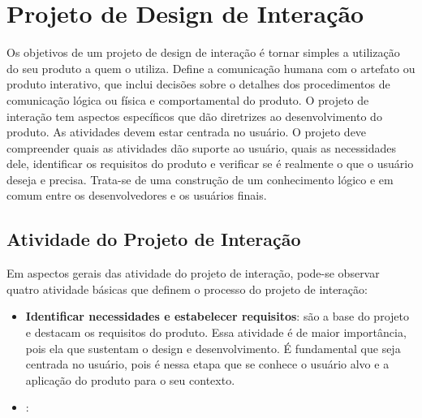 \chapter[Projeto de Design de Interação]{Projeto de Design de Interação}

Os objetivos de um projeto de design de interação é tornar simples a utilização do seu produto a quem o utiliza. Define a comunicação humana com o artefato ou produto interativo, que inclui decisões sobre o detalhes dos procedimentos de comunicação lógica ou física e comportamental do produto.
O projeto de interação tem aspectos específicos que dão diretrizes ao desenvolvimento do produto. As atividades devem estar centrada no usuário. O projeto deve compreender quais as atividades dão suporte ao usuário, quais as necessidades dele, identificar os requisitos do produto e verificar se é realmente o que o usuário deseja e precisa. Trata-se de uma construção de um conhecimento lógico e em comum entre os desenvolvedores e os usuários finais.

\section{Atividade do Projeto de Interação}

Em aspectos gerais das atividade do projeto de interação, pode-se observar quatro atividade básicas que definem o processo do projeto de interação:

\begin{itemize}
	\item \textbf{Identificar necessidades e estabelecer requisitos}: são a base do projeto e destacam os requisitos do produto. Essa atividade é de maior importância, pois ela que sustentam o design e desenvolvimento. É fundamental que seja centrada no usuário, pois é nessa etapa que se conhece o usuário alvo e a aplicação do produto para o seu contexto.
	\item \textbf{}:
\end{itemize}	